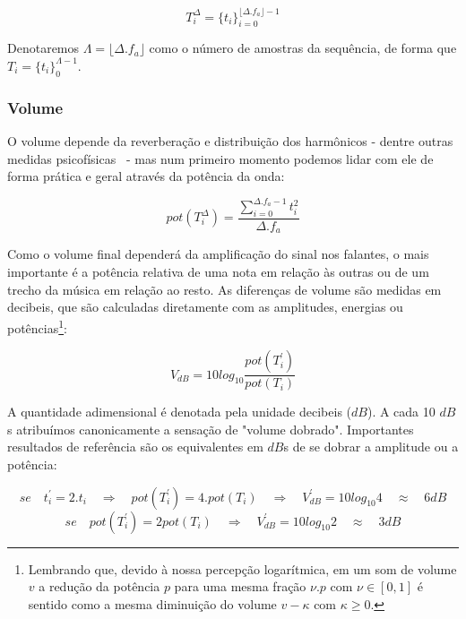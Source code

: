 \begin{equation}
T_{i}^{\Delta}={\{t_i\}}_{i=0}^{\lfloor \Delta . f_a \rfloor -1}
\end{equation}

Denotaremos $\Lambda = \lfloor \Delta . f_a \rfloor$ como o número de amostras da sequência, de forma que $T_i=\{t_i\}_0^{\Lambda-1}$.

\subsubsection{Volume}
O volume depende da reverberação e distribuição dos harmônicos - dentre outras medidas psicofísicas~\cite{chowningVolume} - mas num primeiro momento podemos lidar com ele de forma prática e geral através da potência da onda:

\begin{equation}\label{potencia}
pot(T_i^{\Delta})=\frac{\sum_{i=0}^{\Delta . f_a -1} t_i^2}{\Delta . f_a}
\end{equation} 

Como o volume final dependerá da amplificação do sinal nos falantes, o mais importante é a potência relativa de uma nota em relação às outras ou de um trecho da música em relação ao resto. As diferenças de volume são medidas em decibeis, que são
calculadas diretamente com as amplitudes, energias ou potências\footnote{Lembrando que, devido à nossa percepção logarítmica,
em um som de volume $v$ a redução da potência $p$ para uma mesma fração $\nu . p $ 
com $\nu \in [0,1]$ é sentido como a mesma diminuição do volume $v-\kappa$ com $\kappa \geq 0$.}:

\begin{equation}\label{decibeis}
V_{dB}=10log_{10}\frac{pot(T^{'}_i)}{pot(T_i)}
\end{equation}

A quantidade adimensional é denotada pela unidade decibeis ($dB$). A cada 10 $dB$s atribuímos canonicamente
a sensação de "volume dobrado". Importantes resultados de referência são os equivalentes em $dB$s de se dobrar
a amplitude ou a potência:

\begin{equation*}
se \quad  t_i^{'}=2 . t_i \quad \Rightarrow \quad pot(T^{'}_i)=4 . pot(T_i) \quad \Rightarrow \quad V^{'}_{dB}=10log_{10} 4 \quad  \approx \quad 6 dB
\end{equation*}
\begin{equation*}
se \quad pot(T^{'}_i)=2 pot(T_i) \quad \Rightarrow \quad V^{'}_{dB}=10log_{10} 2 \quad \approx \quad 3 dB
\end{equation*}

